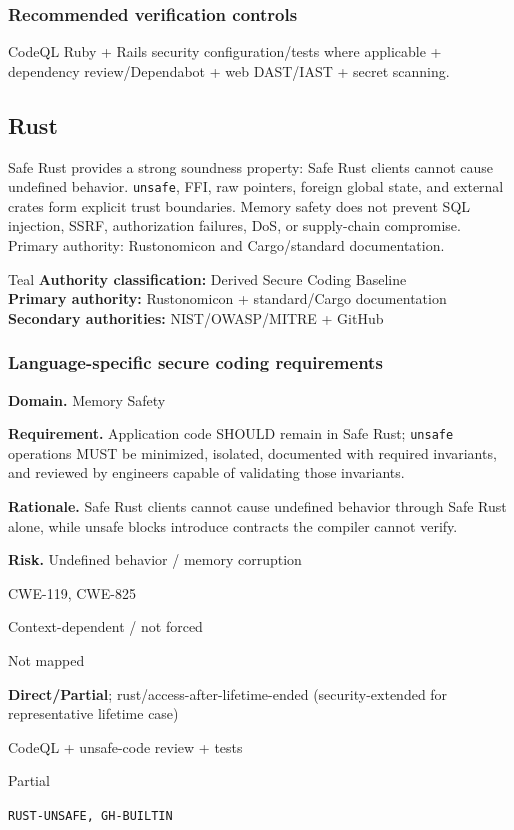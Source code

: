 \documentclass[10pt,letterpaper]{article}
\newcommand{\code}[1]{\texttt{\small #1}}
\newcommand{\prioritybadge}[2]{\tcbox[on line,boxrule=0pt,arc=1.2mm,boxsep=0.7mm,left=1mm,right=1mm,top=0.4mm,bottom=0.4mm,colback=#2!12,coltext=#2]{\scriptsize\bfseries #1}}
\begin{document}
\subsubsection*{Recommended verification controls}
CodeQL Ruby + Rails security configuration/tests where applicable + dependency review/Dependabot + web DAST/IAST + secret scanning.
\clearpage
\subsection{Rust}
Safe Rust provides a strong soundness property: Safe Rust clients cannot cause undefined behavior. \code{unsafe}, FFI, raw pointers, foreign global state, and external crates form explicit trust boundaries. Memory safety does not prevent SQL injection, SSRF, authorization failures, DoS, or supply-chain compromise. Primary authority: Rustonomicon and Cargo/standard documentation.
\begin{callout}{Teal}
\textbf{Authority classification:} Derived Secure Coding Baseline\\
\textbf{Primary authority:} Rustonomicon + standard/Cargo documentation\\
\textbf{Secondary authorities:} NIST/OWASP/MITRE + GitHub
\end{callout}
\subsubsection*{Language-specific secure coding requirements}

\begin{rulebox}[title={\texttt{SCS-RUST-MEM-001} \hfill \prioritybadge{Critical Control}{Critical}}]
\textbf{Domain.} Memory Safety

\textbf{Requirement.} Application code SHOULD remain in Safe Rust; \code{unsafe} operations MUST be minimized, isolated, documented with required invariants, and reviewed by engineers capable of validating those invariants.

\textbf{Rationale.} Safe Rust clients cannot cause undefined behavior through Safe Rust alone, while unsafe blocks introduce contracts the compiler cannot verify.

\textbf{Risk.} Undefined behavior / memory corruption

\begin{description}[leftmargin=2.65cm,labelwidth=2.3cm,style=nextline,itemsep=1pt,topsep=3pt]
  \item[CWE] CWE-119, CWE-825
  \item[OWASP] Context-dependent / not forced
  \item[CERT] Not mapped
  \item[CodeQL] \textbf{Direct/Partial}; rust/access-after-lifetime-ended (security-extended for representative lifetime case)
  \item[Enforcement] CodeQL + unsafe-code review + tests
  \item[Automation] Partial
  \item[Sources] \texttt{RUST-UNSAFE, GH-BUILTIN}
\end{description}
\end{rulebox}
\end{document}
